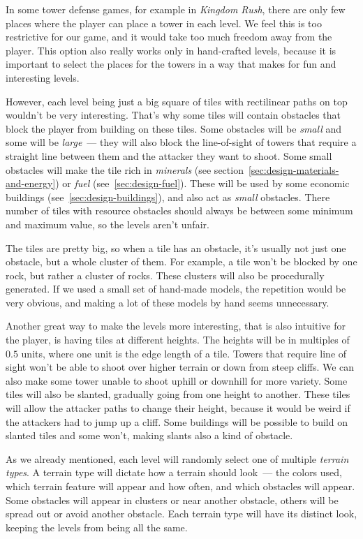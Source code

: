 In some tower defense games, for example in \emph{Kingdom Rush}, there are only few places where the player can place a tower in each level.
We feel this is too restrictive for our game, and it would take too much freedom away from the player.
This option also really works only in hand-crafted levels, because it is important to select the places for the towers in a way that makes for fun and interesting levels.

However, each level being just a big square of tiles with rectilinear paths on top wouldn't be very interesting.
That's why some tiles will contain obstacles that block the player from building on these tiles.
Some obstacles will be \emph{small} and some will be \emph{large}~--- they will also block the line-of-sight of towers that require a straight line between them and the attacker they want to shoot.
Some small obstacles will make the tile rich in \emph{minerals} (see section~\ref{sec:design-materials-and-energy}) or \emph{fuel} (see~\ref{sec:design-fuel}).
These will be used by some economic buildings (see~\ref{sec:design-buildings}), and also act as \emph{small} obstacles.
There number of tiles with resource obstacles should always be between some minimum and maximum value, so the levels aren't unfair.

The tiles are pretty big, so when a tile has an obstacle, it's usually not just one obstacle, but a whole cluster of them.
For example, a tile won't be blocked by one rock, but rather a cluster of rocks.
These clusters will also be procedurally generated.
If we used a small set of hand-made models, the repetition would be very obvious, and making a lot of these models by hand seems unnecessary.

Another great way to make the levels more interesting, that is also intuitive for the player, is having tiles at different heights.
The heights will be in multiples of $0.5$ units, where one unit is the edge length of a tile.
Towers that require line of sight won't be able to shoot over higher terrain or down from steep cliffs.
We can also make some tower unable to shoot uphill or downhill for more variety.
Some tiles will also be slanted, gradually going from one height to another.
These tiles will allow the attacker paths to change their height, because it would be weird if the attackers had to jump up a cliff.
Some buildings will be possible to build on slanted tiles and some won't, making slants also a kind of obstacle.

As we already mentioned, each level will randomly select one of multiple \emph{terrain types}.
A terrain type will dictate how a terrain should look~--- the colors used, which terrain feature will appear and how often, and which obstacles will appear.
Some obstacles will appear in clusters or near another obstacle, others will be spread out or avoid another obstacle.
Each terrain type will have its distinct look, keeping the levels from being all the same.

